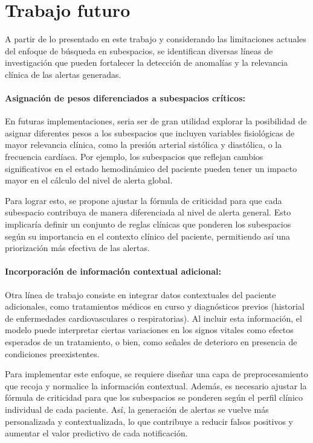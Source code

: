 \section{Trabajo futuro}

A partir de lo presentado en este trabajo y considerando las limitaciones actuales del enfoque de búsqueda en subespacios, se identifican diversas líneas de investigación que pueden fortalecer la detección de anomalías y la relevancia clínica de las alertas generadas.

\paragraph{Asignación de pesos diferenciados a subespacios críticos:}

En futuras implementaciones, seria ser de gran utilidad explorar la posibilidad de asignar diferentes pesos a los subespacios que incluyen variables fisiológicas de mayor relevancia clínica, como la presión arterial sistólica y diastólica, o la frecuencia cardíaca. Por ejemplo, los subespacios que reflejan cambios significativos en el estado hemodinámico del paciente pueden tener un impacto mayor en el cálculo del nivel de alerta global.

Para lograr esto, se propone ajustar la fórmula de criticidad para que cada subespacio contribuya de manera diferenciada al nivel de alerta general. Esto implicaría definir un conjunto de reglas clínicas que ponderen los subespacios según su importancia en el contexto clínico del paciente, permitiendo así una priorización más efectiva de las alertas.

\paragraph{Incorporación de información contextual adicional:}

Otra línea de trabajo consiste en integrar datos contextuales del paciente adicionales, como tratamientos médicos en curso y diagnósticos previos (historial de enfermedades cardiovasculares o respiratorias). Al incluir esta información, el modelo puede interpretar ciertas variaciones en los signos vitales como efectos esperados de un tratamiento, o bien, como señales de deterioro en presencia de condiciones preexistentes.

Para implementar este enfoque, se requiere diseñar una capa de preprocesamiento que recoja y normalice la información contextual. Además, es necesario ajustar la fórmula de criticidad para que los subespacios se ponderen según el perfil clínico individual de cada paciente. Así, la generación de alertas se vuelve más personalizada y contextualizada, lo que contribuye a reducir falsos positivos y aumentar el valor predictivo de cada notificación.

